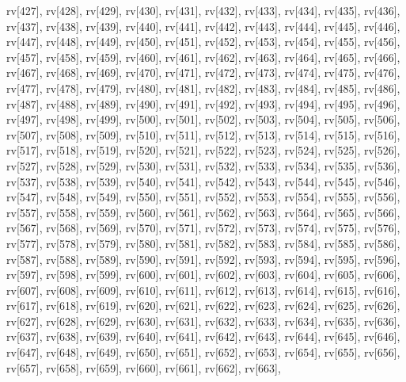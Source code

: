 \begin{DoxyCode}
{  rv[427],
  rv[428],
  rv[429],
  rv[430],
  rv[431],
  rv[432],
  rv[433],
  rv[434],
  rv[435],
  rv[436],
  rv[437],
  rv[438],
  rv[439],
  rv[440],
  rv[441],
  rv[442],
  rv[443],
  rv[444],
  rv[445],
  rv[446],
  rv[447],
  rv[448],
  rv[449],
  rv[450],
  rv[451],
  rv[452],
  rv[453],
  rv[454],
  rv[455],
  rv[456],
  rv[457],
  rv[458],
  rv[459],
  rv[460],
  rv[461],
  rv[462],
  rv[463],
  rv[464],
  rv[465],
  rv[466],
  rv[467],
  rv[468],
  rv[469],
  rv[470],
  rv[471],
  rv[472],
  rv[473],
  rv[474],
  rv[475],
  rv[476],
  rv[477],
  rv[478],
  rv[479],
  rv[480],
  rv[481],
  rv[482],
  rv[483],
  rv[484],
  rv[485],
  rv[486],
  rv[487],
  rv[488],
  rv[489],
  rv[490],
  rv[491],
  rv[492],
  rv[493],
  rv[494],
  rv[495],
  rv[496],
  rv[497],
  rv[498],
  rv[499],
  rv[500],
  rv[501],
  rv[502],
  rv[503],
  rv[504],
  rv[505],
  rv[506],
  rv[507],
  rv[508],
  rv[509],
  rv[510],
  rv[511],
  rv[512],
  rv[513],
  rv[514],
  rv[515],
  rv[516],
  rv[517],
  rv[518],
  rv[519],
  rv[520],
  rv[521],
  rv[522],
  rv[523],
  rv[524],
  rv[525],
  rv[526],
  rv[527],
  rv[528],
  rv[529],
  rv[530],
  rv[531],
  rv[532],
  rv[533],
  rv[534],
  rv[535],
  rv[536],
  rv[537],
  rv[538],
  rv[539],
  rv[540],
  rv[541],
  rv[542],
  rv[543],
  rv[544],
  rv[545],
  rv[546],
  rv[547],
  rv[548],
  rv[549],
  rv[550],
  rv[551],
  rv[552],
  rv[553],
  rv[554],
  rv[555],
  rv[556],
  rv[557],
  rv[558],
  rv[559],
  rv[560],
  rv[561],
  rv[562],
  rv[563],
  rv[564],
  rv[565],
  rv[566],
  rv[567],
  rv[568],
  rv[569],
  rv[570],
  rv[571],
  rv[572],
  rv[573],
  rv[574],
  rv[575],
  rv[576],
  rv[577],
  rv[578],
  rv[579],
  rv[580],
  rv[581],
  rv[582],
  rv[583],
  rv[584],
  rv[585],
  rv[586],
  rv[587],
  rv[588],
  rv[589],
  rv[590],
  rv[591],
  rv[592],
  rv[593],
  rv[594],
  rv[595],
  rv[596],
  rv[597],
  rv[598],
  rv[599],
  rv[600],
  rv[601],
  rv[602],
  rv[603],
  rv[604],
  rv[605],
  rv[606],
  rv[607],
  rv[608],
  rv[609],
  rv[610],
  rv[611],
  rv[612],
  rv[613],
  rv[614],
  rv[615],
  rv[616],
  rv[617],
  rv[618],
  rv[619],
  rv[620],
  rv[621],
  rv[622],
  rv[623],
  rv[624],
  rv[625],
  rv[626],
  rv[627],
  rv[628],
  rv[629],
  rv[630],
  rv[631],
  rv[632],
  rv[633],
  rv[634],
  rv[635],
  rv[636],
  rv[637],
  rv[638],
  rv[639],
  rv[640],
  rv[641],
  rv[642],
  rv[643],
  rv[644],
  rv[645],
  rv[646],
  rv[647],
  rv[648],
  rv[649],
  rv[650],
  rv[651],
  rv[652],
  rv[653],
  rv[654],
  rv[655],
  rv[656],
  rv[657],
  rv[658],
  rv[659],
  rv[660],
  rv[661],
  rv[662],
  rv[663],
}
\end{DoxyCode}
